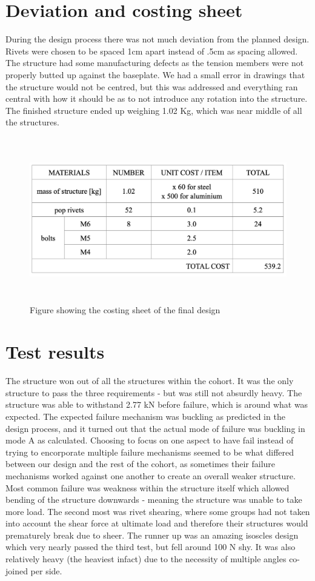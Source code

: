 \documentclass[12pt]{article}
\begin{document}
    \section{Deviation and costing sheet}
    During the design process there was not much deviation from the planned design. Rivets were chosen to be spaced 1cm apart instead of .5cm as spacing allowed. The structure had some
    manufacturing defects as the tension members were not properly butted up against the baseplate. We had a small error in drawings that the structure would not be centred, 
    but this was addressed and everything ran central with how it should be as to not introduce any rotation into the structure. The finished structure ended up weighing 1.02 Kg,
    which was near middle of all the structures. 
    \begin{figure}[H]
        \begin{center}
        \captionsetup{labelfont=bf}
        \captionsetup{justification=centering}
        \includegraphics[height=17pc]{costing_sheet.png}
        \caption{Figure showing the costing sheet of the final design}
        \end{center}
    \end{figure}
    \section{Test results}
        The structure won out of all the structures within the cohort. It was the only structure to pass the three requirements - but was still not absurdly heavy. The structure
        was able to withstand 2.77 kN before failure, which is around what was expected. The expected failure mechanism was buckling as predicted in the design process, and it turned out
        that the actual mode of failure was buckling in mode A as calculated. Choosing to focus on one aspect to have fail instead of trying to encorporate multiple failure mechanisms seemed
        to be what differed between our design and the rest of the cohort, as sometimes their failure mechanisms worked against one another to create an overall weaker structure. Most common
        failure was weakness within the structure itself which allowed bending of the structure downwards - meaning the structure was unable to take more load. The second most was rivet shearing,
        where some groups had not taken into account the shear force at ultimate load and therefore their structures would prematurely break due to sheer. The runner up was an amazing
        isoscles design which very nearly passed the third test, but fell around 100 N shy. It was also relatively heavy (the heaviest infact) due to the necessity of multiple angles co-joined per side.
\end{document}
